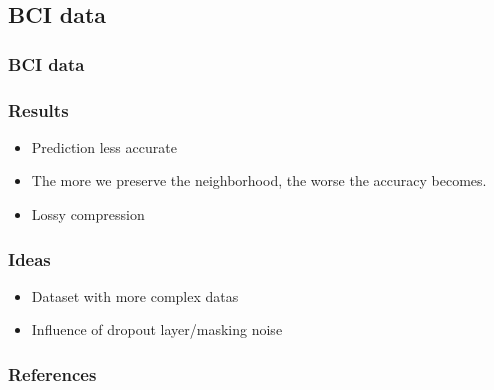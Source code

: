 \documentclass{beamer}
\begin{document}
\subsection{BCI data}

\begin{frame}
\frametitle{BCI data}

\end{frame}

\begin{frame}
    \frametitle{Results}
    \begin{itemize}
        \item Prediction less accurate
        \item The more we preserve the neighborhood, the worse the accuracy becomes.
        \item Lossy compression
    \end{itemize}
\end{frame}
\begin{frame}
    \frametitle{Ideas}
    \begin{itemize}
        \item Dataset with more complex datas 
        \item Influence of dropout layer/masking noise
    \end{itemize}
\end{frame}

\begin{frame}[allowframebreaks]
    \frametitle{References}
    
    
\end{frame}


\end{document}
